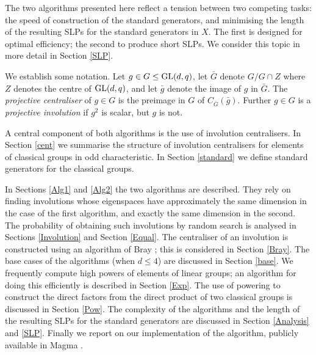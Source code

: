 \documentclass[12pt]{article}
\def\GL{{\rm GL}}
\begin{document}
The two algorithms presented here reflect a tension 
between two competing tasks: the speed of construction
of the standard generators, and minimising the 
length of the resulting SLPs for the standard 
generators in $X$.
The first is designed for optimal efficiency; 
the second to produce short SLPs.
We consider this topic in more detail in Section \ref{SLP}.

We establish some notation. 
Let $g\in G \leq \GL(d, q)$, 
let $\bar{G}$ denote $G / G \cap Z$
where $Z$ denotes the centre of $\GL(d, q)$,
and let $\bar{g}$ denote the image of $g$ in $\bar{G}$.
The {\it projective centraliser} of $g \in G$
is the preimage in $G$ of $C_{\bar{G}} (\bar{g})$.
Further $g \in G$ is a {\it projective involution} 
if $g^2$ is scalar, but $g$ is not.

A central component of both algorithms
is the use of involution centralisers.
In Section \ref{cent} we summarise
the structure of involution centralisers
for elements of classical groups in odd characteristic.
In Section \ref{standard} we define
standard generators for the classical groups.

In Sections \ref{Alg1} and \ref{Alg2} the two 
algorithms are described. They
rely on finding involutions  whose eigenspaces  have
approximately the same  dimension in the case of the first algorithm,
and exactly the same dimension  in the second. The probability
of obtaining such involutions by random search
is analysed in Sections \ref{Involution} and Section \ref{Equal}.
The centraliser of an involution  is constructed using an 
algorithm of Bray \cite{Bray}; this is considered
in Section \ref{Bray}. The base cases of the
algorithms (when $d \leq 4$) are discussed in Section \ref{base}. 
We frequently compute high powers of elements of linear groups; 
an algorithm for doing this
efficiently is described in Section \ref{Exp}. The use of powering to
construct the direct factors from the direct product of two classical
groups is discussed in Section \ref{Pow}. 
The complexity of the algorithms and the 
length of the resulting SLPs for the standard generators
are discussed in Section \ref{Analysis} and \ref{SLP}.  
Finally we report on our implementation of the algorithm, 
publicly available in {\sc Magma} \cite{Magma}.
\end{document}
